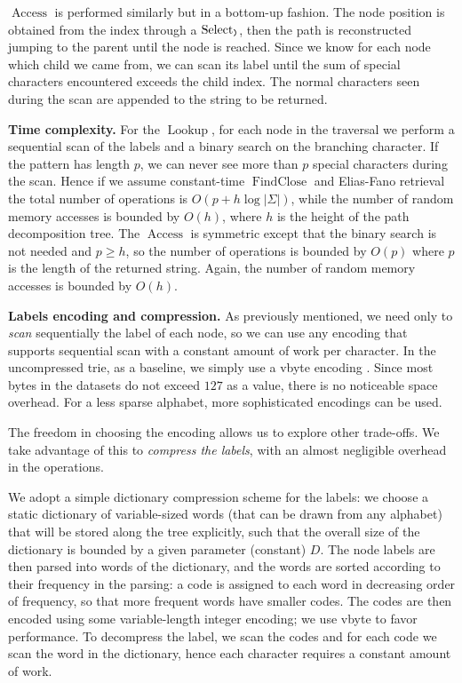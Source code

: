 \documentclass[a4paper,11pt]{article}
\newcommand{\ttlpar}[1]{\noindent\textbf{#1}}
\theoremstyle{nonumberplain}
\DeclareMathOperator{\Access}{Access}
\DeclareMathOperator{\Select}{Select}
\DeclareMathOperator{\Lookup}{Lookup}
\DeclareMathOperator{\FindClose}{FindClose}
\newcommand{\parclose}{\text{\bf\texttt{)}}}
\begin{document}
$\Access$ is performed similarly but in a bottom-up fashion. The node
position is obtained from the index through a $\Select_{\parclose}$,
then the path is reconstructed jumping to the parent until the node is
reached. Since we know for each node which child we came from, we can
scan its label until the sum of special characters encountered exceeds
the child index. The normal characters seen during the scan are
appended to the string to be returned.

\ttlpar{Time complexity.}
For the $\Lookup$, for each node in the traversal we perform a
sequential scan of the labels and a binary search on the branching
character. If the pattern has length $p$, we can never see more than
$p$ special characters during the scan. Hence if we assume
constant-time $\FindClose$ and Elias-Fano retrieval the total number
of operations is $O(p + h \log |\Sigma|)$, while the number of random
memory accesses is bounded by $O(h)$, where $h$ is the height of the
path decomposition tree. The $\Access$ is symmetric except that the
binary search is not needed and $p \geq h$, so the number of
operations is bounded by $O(p)$ where $p$ is the length of the
returned string. Again, the number of random memory accesses is
bounded by $O(h)$.

\ttlpar{Labels encoding and compression.} 
As previously mentioned, we need only to \emph{scan} sequentially the
label of each node, so we can use any encoding
that supports sequential scan with a constant amount of work per
character.
In the uncompressed trie, as a baseline, we simply use a vbyte encoding
\cite{vbyte}. Since most bytes in the datasets do not exceed $127$ as
a value, there is no noticeable space overhead. For a less sparse
alphabet, more sophisticated encodings can be used.

The freedom in choosing the encoding allows us to explore other
trade-offs. We take advantage of this to \emph{compress the labels},
with an almost negligible overhead in the operations.

We adopt a simple dictionary compression scheme for the labels: we
choose a static dictionary of variable-sized words (that can be drawn from any
alphabet) that will be stored along the tree explicitly, such
that the overall size of the dictionary is bounded by a given
parameter (constant) $D$. The node labels are then parsed into words
of the dictionary, and the words are sorted according to their
frequency in the parsing: a code is assigned to each
word in decreasing order of frequency, so that more frequent words
have smaller codes. The codes are then encoded using some
variable-length integer encoding; we use vbyte to favor
performance.
To decompress the label, we scan the codes and for each code we scan
the word in the dictionary, hence each character requires a constant
amount of work. 
\end{document}
